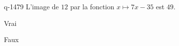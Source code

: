 \begin{truefalse}{q-1479}
L'image de $12$ par la fonction $x\mapsto 7x-35$ est $49$.
\item* Vrai
\item Faux
\end{truefalse}

